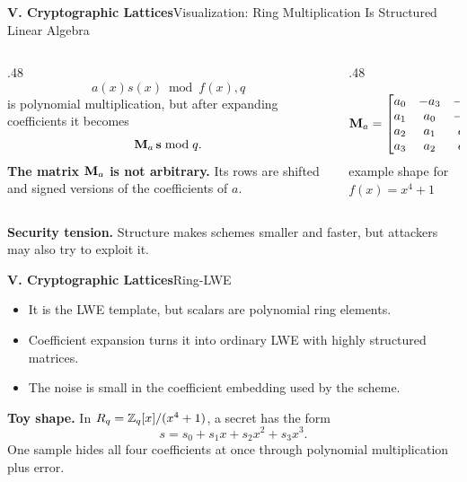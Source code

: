\begin{frame}{\textbf{V. Cryptographic Lattices}}{Visualization: Ring Multiplication Is Structured Linear Algebra}
\small
\begin{columns}[T,onlytextwidth]
\begin{column}{.48\textwidth}
\[
  a(x)s(x)\bmod f(x),q
\]
is polynomial multiplication, but after expanding coefficients it becomes
\[
  \mathbf{M}_a\,\mathbf{s} \bmod q.
\]
\textbf{The matrix $\mathbf{M}_a$ is not arbitrary.}\; Its rows are shifted and signed versions of the coefficients of $a$.
\end{column}
\begin{column}{.48\textwidth}
\begin{center}
\[
\mathbf{M}_a=
\begin{bmatrix}
 a_0 & -a_3 & -a_2 & -a_1\\
 a_1 &  a_0 & -a_3 & -a_2\\
 a_2 &  a_1 &  a_0 & -a_3\\
 a_3 &  a_2 &  a_1 &  a_0
\end{bmatrix}
\]
\vspace{-.15cm}
{\sffamily\small\color{Ink!72} example shape for $f(x)=x^4+1$}
\end{center}
\end{column}
\end{columns}
\vfill
\textbf{Security tension.}\; Structure makes schemes smaller and faster, but attackers may also try to exploit it.
\end{frame}

\begin{frame}[shrink=7]{\textbf{V. Cryptographic Lattices}}{Ring-LWE}
\begin{itemize}
  \item It is the LWE template, but scalars are polynomial ring elements.
  \item Coefficient expansion turns it into ordinary LWE with highly structured matrices.
  \item The noise is small in the coefficient embedding used by the scheme.
\end{itemize}
\textbf{Toy shape.}\; In $R_q=\mathbb{Z}_q[x]/(x^4+1)$, a secret has the form
\[
  s=s_0+s_1x+s_2x^2+s_3x^3.
\]
One sample hides all four coefficients at once through polynomial multiplication plus error.
\end{frame}

